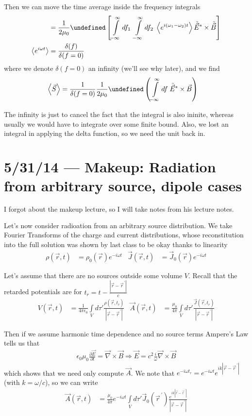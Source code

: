 \documentclass[10pt]{report}
\newcommand{\pd}[2]{\frac{\partial #1}{\partial#2}}
\newcommand{\pvec}[1]{\vec{#1}^{\,\prime}}
\let\Re\undefined
\DeclareMathOperator{\Re}{Re}
\newcommand{\expvalue}[1]{\left<#1\right>}
\newcommand{\abs}[1]{\left|#1\right|}
\begin{document}
Then we can move the time average inside the frequency integrals
\begin{align}
    &= \frac{1}{2\mu_0}\Re\left[ \int\limits_{-\infty}^{\infty}df_1\;\int\limits_{-\infty}^{\infty}df_2\;\expvalue{e^{i\left( \omega_1 - \omega_2 \right)t}}\tilde{\vec{E}}^* \times \tilde{\vec{B}} \right]\\
    \expvalue{e^{i\omega t}} &= \frac{\delta(f)}{\delta(f=0)}
\end{align}
where we denote $\delta(f=0)$ an infinity (we'll see why later), and we find
\begin{align}
    \expvalue{\vec{S}} &= \frac{1}{\delta(f=0)} \frac{1}{2\mu_0}\Re\left( \int\limits_{-\infty}^{\infty}df\;\tilde{\vec{E}}^*\times \vec{B} \right)
\end{align}

The infinity is just to cancel the fact that the integral is also ininite, whereas usually we would have to integrate over some finite bound. Also, we lost an integral in applying the delta function, so we need the unit back in. 
\chapter{5/31/14 --- Makeup: Radiation from arbitrary source, dipole cases}

I forgot about the makeup lecture, so I will take notes from his lecture notes.

Let's now consider radioation from an arbitrary source distribution. We take Fourier Transforms of the charge and current distributions, whose reconstitution into the full solution was shown by last class to be okay thanks to linearity
\begin{align}
    \rho(\vec{r},t) &= \rho_0(\vec{r}) e^{-i\omega t} & \vec{J}(\vec{r},t) &= \vec{J}_0(\vec{r})e^{-i\omega t}
\end{align}

Let's assume that there are no sources outside some volume $V$. Recall that the retarded potentials are for $t_r = t - \frac{\abs{\vec{r} - \pvec{r}}}{c}$
\begin{align}
    V(\vec{r},t) &= \frac{1}{4\pi\epsilon_0}\int\limits_V d\tau' \frac{\rho(\vec{r},t_r)}{\abs{\vec{r} - \pvec{r}}} & \vec{A}(\vec{r},t) &= \frac{\mu_0}{4\pi}\int\limits_V d\tau' \frac{\vec{J}(\vec{r},t_r)}{\abs{\vec{r} - \pvec{r}}}
\end{align}

Then if we assume harmonic time dependence and no source terms Ampere's Law tells us that
\begin{align}
    \epsilon_0 \mu_0\pd{\vec{E}}{t} = \vec{\nabla} \times \vec{B} \Rightarrow \vec{E} = c^2\frac{i}{\omega}\vec{\nabla} \times \vec{B}
\end{align}
which shows that we need only compute $\vec{A}$. We note that $e^{-i\omega t_r} = e^{-i \omega t}e^{ik\abs{\vec{r} - \pvec{r}}}$ (with $k = \omega/c$), so we can write
\begin{align}
    \vec{A}(\vec{r},t) &= \frac{\mu_0}{4\pi}e^{-i\omega t}\int\limits_V d\tau' \vec{J}_0(\pvec{r}) \frac{e^{ik\abs{\vec{r} - \pvec{r}}}}{\abs{\vec{r} - \pvec{r}}}
\end{align}
\end{document}
